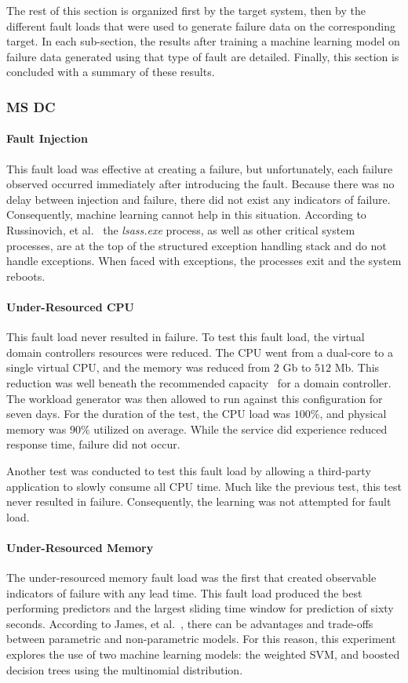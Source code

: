 The rest of this section is organized first by the target system, then by the
different fault loads that were used to generate failure data on the
corresponding target.  In each sub-section, the results after training a
machine learning model on failure data generated using that type of fault are
detailed.  Finally, this section is concluded with a summary of these results.

\subsubsection{\ac{MS} \ac{DC}}
\paragraph{Fault Injection}
This fault load was effective at creating a failure, but unfortunately, each
failure observed occurred immediately after introducing the fault.  Because
there was no delay between injection and failure, there did not exist any
indicators of failure.  Consequently, machine learning cannot help in this
situation.  According to Russinovich, et al.~\cite{russinovich2009} the
\emph{lsass.exe} process, as well as other critical system processes, are at
the top of the structured exception handling stack and do not handle
exceptions.  When faced with exceptions, the processes exit and the system
reboots.

\paragraph{Under-Resourced \ac{CPU}}
This fault load never resulted in failure.  To test this fault load, the
virtual domain controllers resources were reduced.  The \ac{CPU} went from a
dual-core to a single virtual CPU, and the memory was reduced from $2$ Gb to
$512$ Mb.  This reduction was well beneath the recommended
capacity~\cite{mak12} for a domain controller.  The workload generator was then
allowed to run against this configuration for seven days.  For the duration of
the test, the \ac{CPU} load was $100\%$, and physical memory was $90\%$
utilized on average.  While the service did experience reduced response time,
failure did not occur.

Another test was conducted to test this fault load by allowing a third-party
application to slowly consume all \ac{CPU} time.  Much like the previous test,
this test never resulted in failure.  Consequently, the learning was not
attempted for fault load.

\paragraph{Under-Resourced Memory}
The under-resourced memory fault load was the first that created observable
indicators of failure with any lead time.  This fault load produced the best
performing predictors and the largest sliding time window for prediction of
sixty seconds.  According to James, et al.~\cite{islr}, there can be advantages
and trade-offs between parametric and non-parametric models.  For this reason,
this experiment explores the use of two machine learning models: the weighted
\ac{SVM}, and boosted decision trees using the multinomial distribution.  

